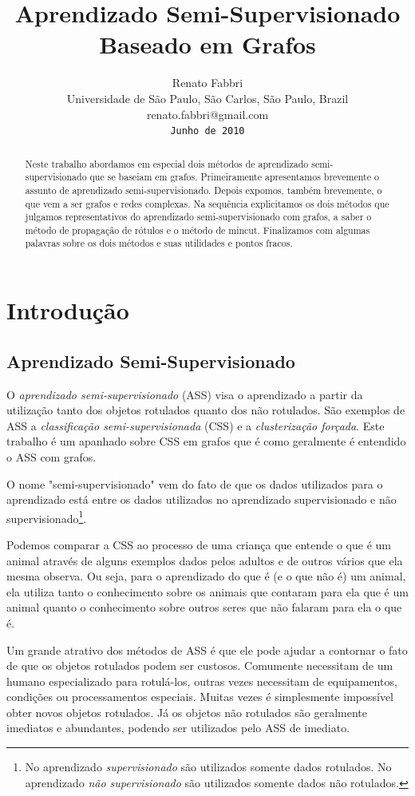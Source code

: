 \documentclass[12pt]{article}
\title{Aprendizado Semi-Supervisionado Baseado em Grafos}
\author{Renato Fabbri\\
Universidade de São Paulo, São Carlos, São Paulo, Brazil\\
{renato.fabbri@gmail.com}\\
{\tt Junho de 2010}}
\begin{document}
\maketitle
\begin{abstract}
Neste trabalho abordamos em especial dois métodos de aprendizado semi-supervisionado que se baseiam em grafos. Primeiramente apresentamos brevemente o assunto de aprendizado semi-supervisionado. Depois expomos, também brevemente, o que vem a ser grafos e redes complexas. Na sequência explicitamos os dois métodos que julgamos representativos do aprendizado semi-supervisionado com grafos, a saber o método de propagação de rótulos e o método de mincut. Finalizamos com algumas palavras sobre os dois métodos e suas utilidades e pontos fracos.
\end{abstract}

\section{Introdução}

\subsection{Aprendizado Semi-Supervisionado}
O \emph{aprendizado semi-supervisionado} (ASS) visa o aprendizado a partir da utilização tanto dos objetos rotulados quanto dos não rotulados. São exemplos de ASS a \emph{classificação semi-supervisionada} (CSS) e a \emph{clusterização forçada}. Este trabalho é um apanhado sobre CSS em grafos que é como geralmente é entendido o ASS com grafos.

O nome "semi-supervisionado" vem do fato de que os dados utilizados para o aprendizado está entre os dados utilizados no aprendizado supervisionado e não supervisionado\footnote{No aprendizado \emph{supervisionado} são utilizados somente dados rotulados. No aprendizado \emph{não supervisionado} são utilizados somente dados não rotulados.}.

Podemos comparar a CSS ao processo de uma criança que entende o que é um animal através de alguns exemplos dados pelos adultos e de outros vários que ela mesma observa. Ou seja, para o aprendizado do que é (e o que não é) um animal, ela utiliza tanto o conhecimento sobre os animais que contaram para ela que é um animal quanto o conhecimento sobre outros seres que não falaram para ela o que é.

Um grande atrativo dos métodos de ASS é que ele pode ajudar a contornar o fato de que os objetos rotulados podem ser custosos. Comumente necessitam de um humano especializado para rotulá-los, outras vezes necessitam de equipamentos, condições ou processamentos especiais. Muitas vezes é simplesmente impossível obter novos objetos rotulados. Já os objetos não rotulados são geralmente imediatos e abundantes, podendo ser utilizados pelo ASS de imediato.
\end{document}
